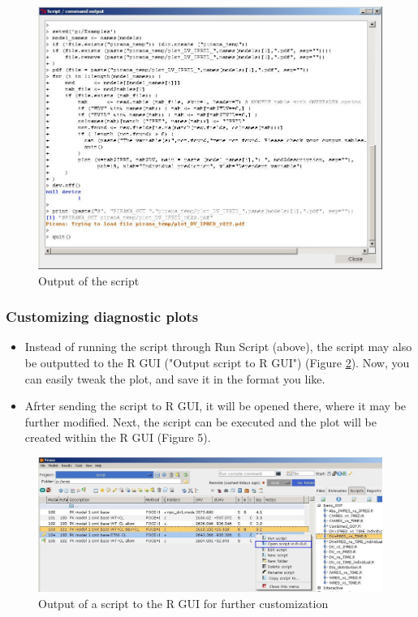 \begin{figure}[hctb] \centering
    \includegraphics[scale=.45]{images/graphs_2.jpg}
    \caption{Output of the script\label{fig:Fig3}}
\end{figure}


\subsubsection*{Customizing diagnostic plots}
\begin{itemize}
\item Instead of running the script through Run Script (above), the
  script may also be outputted to the R GUI ("Output script to R GUI")
  (Figure \ref{fig:Fig4}). Now, you can easily tweak the plot, and save it in the
  format you like. 
\item Afrter sending the script to R GUI, it will be opened there,
  where it may be further modified. Next, the script can be executed
  and the plot will be created within the R GUI (Figure 5).
\end{itemize}

\begin{figure}[h] \centering
    \includegraphics[scale=.3]{images/graphs_4.jpg}
    \caption{Output of a script to the R GUI for further customization\label{fig:Fig4}}
\end{figure}


